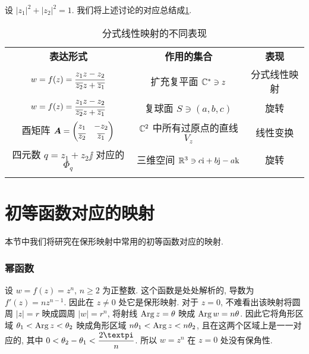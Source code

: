 设 $|z_1|^2+|z_2|^2=1$.
我们将上述讨论的对应总结成\ref{tab:fractal-transform-display}.

\begin{table}[!htb]
  \centering
  \begin{tabular}{ccc}
    \topcolorrule
      \bf 表达形式&
      \bf 作用的集合&
      \bf 表现\\
    \topcolorrule
      $w=f(z)=\dfrac{z_1z-z_2}{\overline{z_2}z+\overline{z_1}}$&
      扩充复平面 ${\mathbb{C}}^*\ni z$&
      分式线性映射\\
    \midcolorrule
      $w=f(z)=\dfrac{z_1z-z_2}{\overline{z_2}z+\overline{z_1}}$&
      复球面 $S\ni (a,b,c)$&
      旋转\\
    \midcolorrule
      酉矩阵 ${\boldsymbol{A}}=\begin{pmatrix}
        z_1&-z_2\\
        \overline{z_2}&\overline{z_1}
      \end{pmatrix}$&
      ${\mathbb{C}}^2$ 中所有过原点的直线 $V_z$&
      线性变换\\
    \midcolorrule
      四元数 $q=z_1+z_2\jj$ 对应的 $\Phi_q$&
      三维空间 ${\mathbb{R}}^3\ni c\mathrm{i}+b\mathrm{j}-a\mathrm{k}$&
      旋转\\
    \bottomcolorrule
  \end{tabular}
  \caption{分式线性映射的不同表现}
  \label{tab:fractal-transform-display}
\end{table}



\section{初等函数对应的映射}

本节中我们将研究在保形映射中常用的初等函数对应的映射.

\subsubsection{幂函数}

设 $w=f(z)=z^n$, $n\ge2$ 为正整数.
这个函数是处处解析的, 导数为 $f'(z)=nz^{n-1}$.
因此在 $z\neq0$ 处它是保形映射.
对于 $z=0$, 不难看出该映射将圆周 $|z|=r$ 映成圆周 $|w|=r^n$, 将射线 $\operatorname{Arg} z=\theta$ 映成 $\operatorname{Arg} w=n\theta$.
因此它将角形区域 $\theta_1<\operatorname{Arg} z<\theta_2$ 映成角形区域 $n\theta_1<\operatorname{Arg} z<n\theta_2$, 且在这两个区域上是一一对应的, 其中 $0<\theta_2-\theta_1<\dfrac{2\cpi}n$.
所以 $w=z^n$ 在 $z=0$ 处没有保角性.

